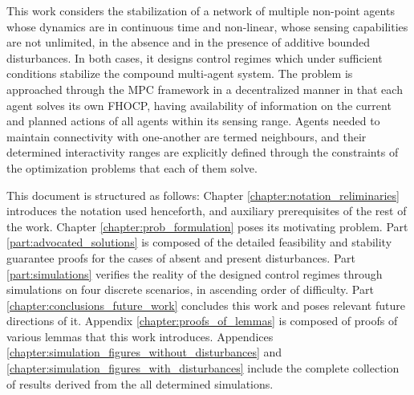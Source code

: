 This work considers the stabilization of a network of multiple non-point agents
whose dynamics are in continuous time and non-linear, whose sensing
capabilities are not unlimited, in the absence and in the presence of additive
bounded disturbances. In both cases, it designs control regimes which under
sufficient conditions stabilize the compound multi-agent system.
The problem is approached through the MPC framework in a
decentralized manner in that each agent solves its own FHOCP, having
availability of information on the current and planned actions of all agents
within its sensing range. Agents needed to maintain connectivity with one-another
are termed neighbours, and their determined interactivity ranges are explicitly
defined through the constraints of the optimization problems that each of them
solve.

This document is structured as follows:
Chapter \ref{chapter:notation_reliminaries} introduces the notation used
henceforth, and auxiliary prerequisites of the rest of the work.
Chapter \ref{chapter:prob_formulation} poses its motivating problem.
Part \ref{part:advocated_solutions} is composed of the detailed feasibility
and stability guarantee proofs for the cases of absent and present
disturbances.
Part \ref{part:simulations} verifies the reality of the designed control regimes
through simulations on four discrete scenarios, in ascending order of
difficulty.
Part \ref{chapter:conclusions_future_work} concludes this work and poses
relevant future directions of it.
Appendix \ref{chapter:proofs_of_lemmas} is composed of proofs of various lemmas
that this work introduces.
Appendices \ref{chapter:simulation_figures_without_disturbances} and
\ref{chapter:simulation_figures_with_disturbances} include the complete
collection of results derived from the all determined simulations.
